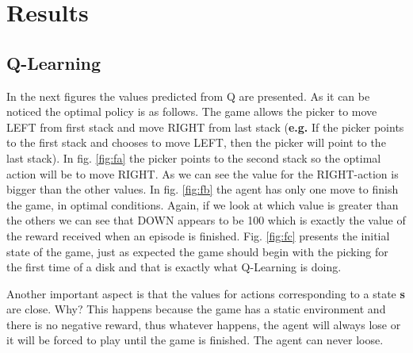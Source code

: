 \chapter{Results}
\label{chapter:results}


\section{Q-Learning}
In the next figures the values predicted from Q are presented. As it can be noticed the optimal policy is as follows. The game allows the picker to move LEFT from first stack and move RIGHT from last stack (\textbf{e.g.} If the picker points to the first stack and chooses to move LEFT, then the picker will point to the last stack). In fig. \ref{fig:fa} the picker points to the second stack so the optimal action will be to move RIGHT. As we can see the value for the RIGHT-action is bigger than the other values. In fig. \ref{fig:fb} the agent has only one move to finish the game, in optimal conditions. Again, if we look at which value is greater than the others we can see that DOWN appears to be 100 which is exactly the value of the reward received when an episode is finished. Fig. \ref{fig:fc} presents the initial state of the game, just as expected the game should begin with the picking for the first time of a disk and that is exactly what Q-Learning is doing.

Another important aspect is that the values for actions corresponding to a state \textbf{s} are close. Why? This happens because the game has a static environment and there is no negative reward, thus whatever happens, the agent will always lose or it will be forced to play until the game is finished. The agent can never loose.

